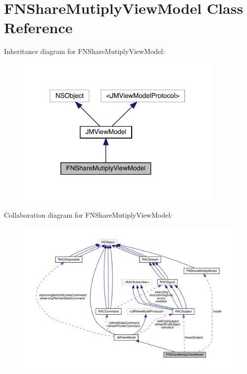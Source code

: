 \hypertarget{interface_f_n_share_mutiply_view_model}{}\section{F\+N\+Share\+Mutiply\+View\+Model Class Reference}
\label{interface_f_n_share_mutiply_view_model}


Inheritance diagram for F\+N\+Share\+Mutiply\+View\+Model\+:\nopagebreak
\begin{figure}[H]
\begin{center}
\leavevmode
\includegraphics[width=284pt]{interface_f_n_share_mutiply_view_model__inherit__graph}
\end{center}
\end{figure}


Collaboration diagram for F\+N\+Share\+Mutiply\+View\+Model\+:\nopagebreak
\begin{figure}[H]
\begin{center}
\leavevmode
\includegraphics[width=350pt]{interface_f_n_share_mutiply_view_model__coll__graph}
\end{center}
\end{figure}
